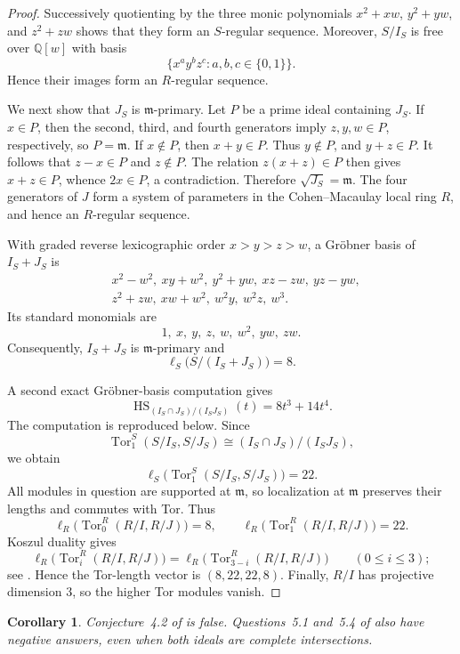 \documentclass[11pt]{amsart}
\newtheorem{corollary}[theorem]{Corollary}
\begin{document}
\begin{proof}
Successively quotienting by the three monic polynomials
$x^2+xw$, $y^2+yw$, and $z^2+zw$ shows that they form an $S$-regular
sequence. Moreover, $S/I_S$ is free over $\mathbb Q[w]$ with basis
\[
\{x^ay^bz^c:a,b,c\in\{0,1\}\}.
\]
Hence their images form an $R$-regular sequence.

We next show that $J_S$ is $\mathfrak m$-primary. Let $P$ be a prime
ideal containing $J_S$. If $x\in P$, then the second, third, and fourth
generators imply $z,y,w\in P$, respectively, so $P=\mathfrak m$.
If $x\notin P$, then $x+y\in P$. Thus $y\notin P$, and $y+z\in P$.
It follows that $z-x\in P$ and $z\notin P$. The relation
$z(x+z)\in P$ then gives $x+z\in P$, whence $2x\in P$, a contradiction.
Therefore $\sqrt{J_S}=\mathfrak m$. The four generators of $J$ form a
system of parameters in the Cohen--Macaulay local ring $R$, and hence an
$R$-regular sequence.

With graded reverse lexicographic order $x>y>z>w$, a Gr\"obner basis of
$I_S+J_S$ is
\begin{align*}
&x^2-w^2,\ xy+w^2,\ y^2+yw,\ xz-zw,\ yz-yw,\\
&z^2+zw,\ xw+w^2,\ w^2y,\ w^2z,\ w^3.
\end{align*}
Its standard monomials are
\[
1,\ x,\ y,\ z,\ w,\ w^2,\ yw,\ zw.
\]
Consequently, $I_S+J_S$ is $\mathfrak m$-primary and
\[
\ell_S\bigl(S/(I_S+J_S)\bigr)=8.
\]

A second exact Gr\"obner-basis computation gives
\begin{equation}\label{eq:hilbert-tor}
\operatorname{HS}_{(I_S\cap J_S)/(I_SJ_S)}(t)=8t^3+14t^4.
\end{equation}
The computation is reproduced below. Since
\[
\operatorname{Tor}_1^S(S/I_S,S/J_S)
\cong (I_S\cap J_S)/(I_SJ_S),
\]
we obtain
\[
\ell_S\bigl(\operatorname{Tor}_1^S(S/I_S,S/J_S)\bigr)=22.
\]
All modules in question are supported at $\mathfrak m$, so localization
at $\mathfrak m$ preserves their lengths and commutes with Tor. Thus
\[
\ell_R\bigl(\operatorname{Tor}_0^R(R/I,R/J)\bigr)=8,
\qquad
\ell_R\bigl(\operatorname{Tor}_1^R(R/I,R/J)\bigr)=22.
\]
Koszul duality gives
\[
\ell_R\bigl(\operatorname{Tor}_i^R(R/I,R/J)\bigr)
=
\ell_R\bigl(\operatorname{Tor}_{3-i}^R(R/I,R/J)\bigr)
\qquad (0\leq i\leq3);
\]
see \cite[Proposition~1.9]{BLP}. Hence the Tor-length vector is
$(8,22,22,8)$. Finally, $R/I$ has projective dimension $3$, so the higher
Tor modules vanish.
\end{proof}

\begin{corollary}\label{cor:consequences}
Conjecture~4.2 of \cite{BLP} is false. Questions~5.1 and~5.4 of
\cite{BLP} also have negative answers, even when both ideals are complete
intersections.
\end{corollary}
\end{document}
